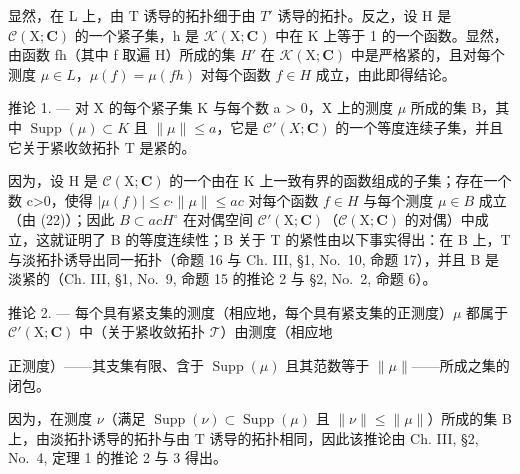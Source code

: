 显然，在 L 上，由 T 诱导的拓扑细于由 \(T'\) 诱导的拓扑。反之，设 H 是 \(\mathcal{C}(\mathrm{X};\mathbf{C})\) 的一个紧子集，h 是 \(\mathcal{K}(\mathrm{X};\mathbf{C})\) 中在 K 上等于 1 的一个函数。显然，由函数 fh（其中 f 取遍 H）所成的集 \(H'\) 在 \(\mathcal{K}(\mathrm{X};\mathbf{C})\) 中是严格紧的，且对每个测度 \(\mu\in L\)，\(\mu(f)=\mu(fh)\) 对每个函数 \(f\in H\) 成立，由此即得结论。

推论 1. --- 对 X 的每个紧子集 K 与每个数 a \textgreater{} 0，X 上的测度 \(\mu\) 所成的集 B，其中 \(\operatorname{Supp}(\mu) \subset K\) 且 \(\|\mu\| \leqslant a\)，它是 \(\mathcal{C}'(X; \mathbf{C})\) 的一个等度连续子集，并且它关于紧收敛拓扑 T 是紧的。

因为，设 H 是 \(\mathcal{C}(\mathrm{X};\mathbf{C})\) 的一个由在 K 上一致有界的函数组成的子集；存在一个数 c\textgreater0，使得 \(|\mu(f)|\leqslant c\cdot\|\mu\|\leqslant ac\) 对每个函数 \(f\in H\) 与每个测度 \(\mu\in B\) 成立（由 (22)）；因此 \(B\subset acH^{\circ}\) 在对偶空间 \(\mathcal{C}'(\mathrm{X};\mathbf{C})\)（\(\mathcal{C}(\mathrm{X};\mathbf{C})\) 的对偶）中成立，这就证明了 B 的等度连续性；B 关于 T 的紧性由以下事实得出：在 B 上，T 与淡拓扑诱导出同一拓扑（命题 16 与 Ch. III, §1, No.~10, 命题 17），并且 B 是淡紧的（Ch. III, §1, No.~9, 命题 15 的推论 2 与 §2, No.~2, 命题 6）。

推论 2. --- 每个具有紧支集的测度（相应地，每个具有紧支集的正测度）\(\mu\) 都属于 \(\mathcal{C}'(\mathrm{X};\mathbf{C})\) 中（关于紧收敛拓扑 \(\mathcal{T}\)）由测度（相应地

正测度）——其支集有限、含于 \(\operatorname{Supp}(\mu)\) 且其范数等于 \(\| \mu \|\)——所成之集的闭包。

因为，在测度 \(\nu\)（满足 \(\operatorname{Supp}(\nu) \subset \operatorname{Supp}(\mu)\) 且 \(\|\nu\| \leqslant \|\mu\|\)）所成的集 B 上，由淡拓扑诱导的拓扑与由 T 诱导的拓扑相同，因此该推论由 Ch. III, §2, No.~4, 定理 1 的推论 2 与 3 得出。

